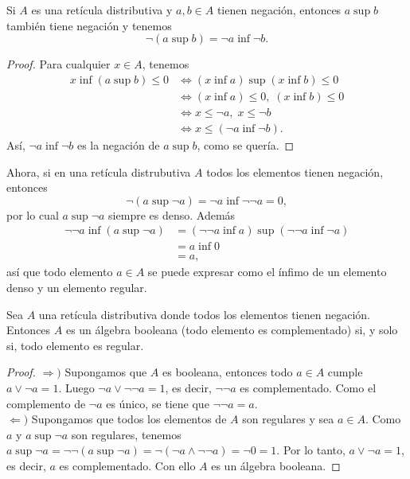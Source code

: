 
\begin{proposition}
  Si $A$ es una retícula distributiva y $a,b\in A$ tienen
  negación, entonces $a\sup b$ también tiene negación y tenemos
  \[
    \neg(a\sup b) = \neg a \inf \neg b
  .\]
\end{proposition}
\begin{proof}
  Para cualquier $x\in A$, tenemos
  \begin{align*}
    x\inf(a\sup b) \leq 0
    &\iff (x\inf a)\sup(x\inf b) \leq 0 \\
    &\iff (x\inf a)\leq 0, \; (x\inf b) \leq 0 \\
    &\iff x\leq\neg a, \; x\leq\neg b \\
    &\iff x\leq(\neg a \inf \neg b).
  \end{align*}
  Así, $\neg a\inf\neg b$ es la negación de $a\sup b$, como se
  quería.
\end{proof}

Ahora, si en una retícula distrubutiva $A$ todos los elementos
tienen negación, entonces
\[
  \neg(a\sup\neg a) = \neg a\inf\neg\neg a = 0
,\]
por lo cual $a\sup\neg a$ siempre es denso.
Además
\begin{align*}
  \neg\neg a\inf(a\sup\neg a)
  &= (\neg\neg a\inf a)\sup(\neg\neg a\inf\neg a) \\
  &= a \inf 0 \\
  &= a,
\end{align*}
así que todo elemento $a\in A$ se puede expresar como el ínfimo
de un elemento denso y un elemento regular.

\begin{lemma}
  Sea $A$ una retícula distributiva donde todos los elementos
  tienen negación.
  Entonces $A$ es un álgebra booleana (todo elemento es
  complementado) si, y solo si, todo elemento es regular.
\end{lemma}
\begin{proof}
    $\Rightarrow )$ Supongamos que $A$ es booleana, entonces todo
    $a\in A$ cumple $a\vee \neg a=1$.
    Luego $\neg a\vee \neg\neg a=1$, es decir, $\neg\neg a$ es
    complementado.
    Como el complemento de $\neg a$ es único, se tiene que $\neg
    \neg a=a$. \\ 
    $\Leftarrow)$ Supongamos que todos los elementos de $A$ son
    regulares y sea $a\in A$.
    Como $a$ y $a\sup\neg a$ son regulares, tenemos
    $a\sup\neg a=\neg\neg (a\sup\neg a)=\neg(\neg
    a\wedge \neg\neg a)=\neg 0=1$.
    Por lo tanto, $a\vee \neg a=1$, es decir, $a$ es
    complementado. Con ello $A$ es un álgebra booleana.
\end{proof}

